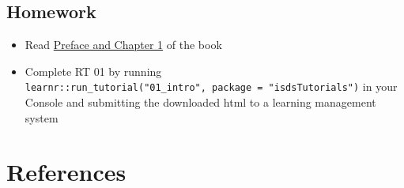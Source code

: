 \documentclass[
  letterpaper,
  DIV=11,
  numbers=noendperiod]{scrreprt}
\newlength{\cslhangindent}
\newlength{\cslentryspacingunit} %
\newenvironment{CSLReferences}[2] %
 {%
  \setlength{\parindent}{0pt}
  \ifodd #1
  \let\oldpar\par
  \def\par{\hangindent=\cslhangindent\oldpar}
  \fi
  \setlength{\parskip}{#2\cslentryspacingunit}
 }%
 {}
\begin{document}
\hypertarget{homework}{%
\section*{Homework}\label{homework}}


\begin{itemize}
\item
  Read \href{https://nustat.github.io/intro-stat-data-sci/}{Preface and
  Chapter 1} of the book
\item
  Complete RT 01 by running
  \texttt{learnr::run\_tutorial("01\_intro",\ package\ =\ "isdsTutorials")}
  in your Console and submitting the downloaded html to a learning
  management system
\end{itemize}


\hypertarget{references}{%
\chapter*{References}\label{references}}


\hypertarget{refs}{}
\begin{CSLReferences}{0}{0}
\end{CSLReferences}
\end{document}
